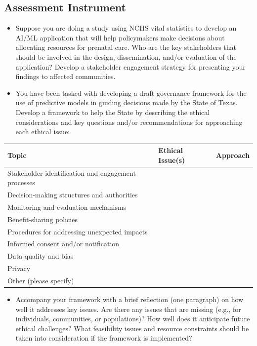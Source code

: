 \subsection{Assessment Instrument}

\begin{itemize}
    \item Suppose you are doing a study using NCHS vital statistics to develop an AI/ML application that will help policymakers make decisions about allocating resources for prenatal care. Who are the key stakeholders that should be involved in the design, dissemination, and/or evaluation of the application? Develop a stakeholder engagement strategy for presenting your findings to affected communities.
    \item You have been tasked with developing a draft governance framework for the use of predictive models in guiding decisions made by the State of Texas. Develop a framework to help the State by describing the ethical considerations and key questions and/or recommendations for approaching each ethical issue:
\end{itemize}

\begin{table}[h]
\centering
\begin{tabular}{|p{}|p{}|p{}|}
\hline
\textbf{Topic} & \textbf{Ethical Issue(s)} & \textbf{Approach} \\
\hline
Stakeholder identification and engagement processes & & \\[2.5em]
\hline
Decision-making structures and authorities & & \\[2.5em]
\hline
Monitoring and evaluation mechanisms & & \\[2.5em]
\hline
Benefit-sharing policies & & \\[2.5em]
\hline
Procedures for addressing unexpected impacts & & \\[2.5em]
\hline
Informed consent and/or notification & & \\[2.5em]
\hline
Data quality and bias & & \\[2.5em]
\hline
Privacy & & \\[2.5em]
\hline
Other (please specify) & & \\[2.5em]
\hline
\end{tabular}
\end{table}

\begin{itemize}
    \item Accompany your framework with a brief reflection (one paragraph) on how well it addresses key issues. Are there any issues that are missing (e.g., for individuals, communities, or populations)? How well does it anticipate future ethical challenges? What feasibility issues and resource constraints should be taken into consideration if the framework is implemented?
\end{itemize}

